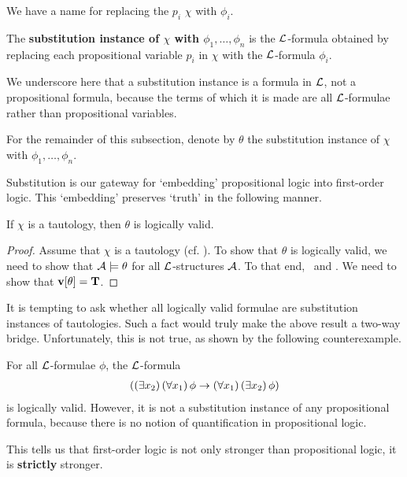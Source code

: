 We have a name for replacing the $p_i$ $\chi$ with $\phi_i$.

\begin{boxdefinition}
    The \textbf{substitution instance of $\chi$ with $\phi_1, \ldots, \phi_n$} is the $\mathcal{L}$-formula obtained by replacing each propositional variable $p_i$ in $\chi$ with the $\mathcal{L}$-formula $\phi_i$.
\end{boxdefinition}
\begin{remark}
    We underscore here that a substitution instance is a formula in $\mathcal{L}$, not a propositional formula, because the terms of which it is made are all $\mathcal{L}$-formulae rather than propositional variables.
\end{remark}

For the remainder of this subsection, denote by $\theta$ the substitution instance of $\chi$ with $\phi_1, \ldots, \phi_n$.

Substitution is our gateway for `embedding' propositional logic into first-order logic. This `embedding' preserves `truth' in the following manner.

\begin{boxtheorem}
    If $\chi$ is a tautology, then $\theta$ is logically valid.
\end{boxtheorem}
\begin{proof}
    Assume that $\chi$ is a tautology (cf. ). To show that $\theta$ is logically valid, we need to show that $\mathcal{A} \models \theta$ for all $\mathcal{L}$-structures $\mathcal{A}$. To that end, \ and \vola. We need to show that $\mathbf{v}\!\left[ \theta \right] = \mathbf{T}$. \sorry
\end{proof}

It is tempting to ask whether all logically valid formulae are substitution instances of tautologies. Such a fact would truly make the above result a two-way bridge. Unfortunately, this is not true, as shown by the following counterexample.

\begin{boxcexample}
    For all $\mathcal{L}$-formulae $\phi$, the $\mathcal{L}$-formula
    \begin{align*}
        \left( \left( \exists x_2 \right)\left( \forall x_1 \right)\phi \to \left( \forall x_1 \right)\left( \exists x_2 \right)\phi \right)
    \end{align*}
    is logically valid. However, it is not a substitution instance of any propositional formula, because there is no notion of quantification in propositional logic.
\end{boxcexample}

This tells us that first-order logic is not only stronger than propositional logic, it is \textbf{strictly} stronger.
